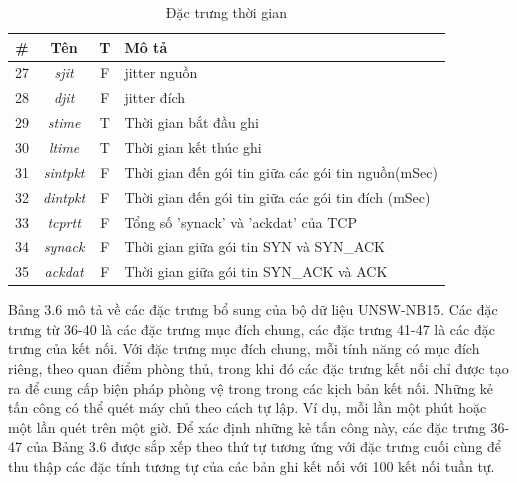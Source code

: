 \begin{table}[H]
    \centering
    \begin{tabular}{|c|c|c|l|}
        \hline
        \textbf{\#}  & \textbf{Tên} & \textbf{T} & \textbf{Mô tả} \\
        \hline
        27 & \textit{sjit} & F & jitter nguồn\\
        \hline
        28 & \textit{djit} & F & jitter đích\\
        \hline
        29 & \textit{stime} & T & Thời gian bắt đầu ghi\\
        \hline
        30 & \textit{ltime} & T & Thời gian kết thúc ghi\\
        \hline
        31 & \textit{sintpkt} & F & Thời gian đến gói tin giữa các gói tin nguồn(mSec)\\
        \hline
        32 & \textit{dintpkt} & F & Thời gian đến gói tin giữa các gói tin đích (mSec)\\
        \hline
        33 & \textit{tcprtt} & F &  Tổng số 'synack' và 'ackdat' của TCP\\
        \hline
        34 & \textit{synack} & F &  Thời gian giữa gói tin SYN và SYN\_ACK\\
        \hline
        35 & \textit{ackdat} & F &  Thời gian giữa gói tin SYN\_ACK và ACK \\
        \hline
    \end{tabular}
    \caption{Đặc trưng thời gian}
    
\end{table}
Bảng 3.6 mô tả về các đặc trưng bổ sung của bộ dữ liệu UNSW-NB15. Các đặc trưng từ 36-40 là các đặc trưng mục đích chung, các đặc trưng 41-47 là các đặc trưng của kết nối. Với đặc trưng mục đích chung, mỗi tính năng có mục đích riêng, theo quan điểm phòng thủ, trong khi đó các đặc trưng kết nối chỉ được tạo ra để cung cấp biện pháp phòng vệ trong trong các kịch bản kết nối. Những kẻ tấn công có thể quét máy chủ theo cách tự lập. Ví dụ, mỗi lần một phút hoặc một lần quét trên một giờ. Để xác định những kẻ tấn công này, các đặc trưng 36-47 của Bảng 3.6 được sắp xếp theo thứ tự tương ứng với đặc trưng cuối cùng để thu thập các đặc tính tương tự của các bản ghi kết nối với 100 kết nối tuần tự.

